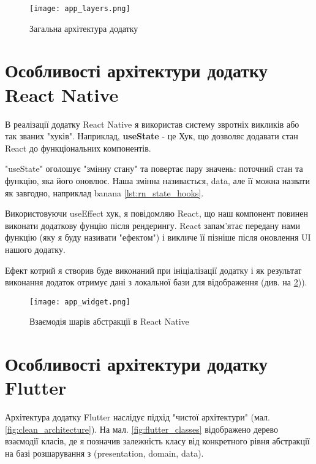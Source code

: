 \begin{figure}
    \begin{center}
        \texttt{[image: app\_layers.png]}
        \caption{Загальна архітектура додатку}
        \label{fig:gen_app_architecture}
    \end{center}
\end{figure}

\section{Особливості архітектури додатку React Native}
\label{sec:kn_app_architecture}
В реалізації додатку React Native я використав систему звротніх викликів або так званих "хуків".
Наприклад, \textbf{useState} - це Хук, що дозволяє додавати стан React до функціональних компонентів.

"useState" оголошує "змінну стану" та повертає пару значень: поточний стан та функцію, яка його оновлює.
Наша змінна називається, data, але її можна назвати як завгодно, наприклад banana \ref{lst:rn_state_hooks}.

Використовуючи useEffect хук, я повідомляю React, що наш компонент повинен виконати додаткову фунцію після рендерингу.
React запам'ятає передану нами функцію (яку я буду називати "ефектом") і викличе її пізніше після оновлення UI нашого додатку.

Ефект котрий я створив буде виконаний при ініціалізації додатку
і як результат виконання додаток отримує дані з локальної бази для відображення (див. на \ref{fig:rn_realm})).

\begin{figure}
    \begin{center}
        \texttt{[image: app\_widget.png]}
        \caption{Взаємодія шарів абстракції в React Native}
        \label{fig:rn_realm}
    \end{center}
\end{figure}


\section{Особливості архітектури додатку Flutter}
\label{sec:flutter_network_app}

Архітектура додатку Flutter наслідує підхід "чистої архітектури" (мал. \ref{fig:clean_architecture}).
На мал. \ref{fig:flutter_classes} відображено дерево взаємодії класів, де я позначив залежність класу
від конкретного рівня абстракції на базі розшарування з (presentation, domain, data).

